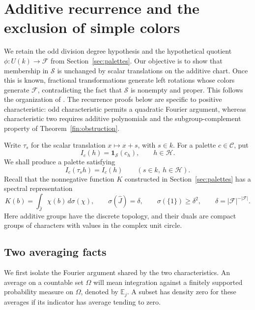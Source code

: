\section{Additive recurrence and the exclusion of simple colors}
\label{sec:recurrence}

We retain the odd division degree hypothesis and the hypothetical quotient
\(\phi:U(k)\to\mathcal F\) from Section~\ref{sec:palettes}.  Our objective is
to show that membership in \(\mathcal S\) is unchanged by scalar translations
on the additive chart.  Once this is known, fractional transformations
generate left rotations whose colors generate \(\mathcal F\), contradicting
the fact that \(\mathcal S\) is nonempty and proper.  This follows the
organization of \cite[Sections~5.5--5.6]{MPNF}.  The recurrence proofs below
are specific to positive characteristic: odd characteristic permits a
quadratic Fourier argument, whereas characteristic two requires additive
polynomials and the subgroup-complement property of
Theorem~\ref{fin:obstruction}.

Write \(\tau_s\) for the scalar translation \(x\mapsto x+s\), with
\(s\in k\).  For a palette \(c\in\mathcal C\), put
\[
 I_c(h)=\boldsymbol 1_{\mathcal S}(c_h),\qquad h\in\mathcal H.
\]
We shall produce a palette satisfying
\begin{equation}\label{rec:translation-invariance}
 I_c(\tau_s h)=I_c(h)\qquad(s\in k,\ h\in\mathcal H).
\end{equation}
Recall that the nonnegative function \(K\) constructed in
Section~\ref{sec:palettes} has a spectral representation
\[
 K(b)=\int_{\widehat J}\chi(b)\,d\sigma(\chi),\qquad
 \sigma(\widehat J)=\delta,\qquad \sigma(\{1\})\geq\delta^2,
 \qquad \delta=|\mathcal F|^{-|\mathcal F|}.
\]
Here additive groups have the discrete topology, and their duals are
compact groups of characters with values in the complex unit circle.

\subsection{Two averaging facts}

We first isolate the Fourier argument shared by the two characteristics.
An average on a countable set \(\Omega\) will mean integration against a
finitely supported probability measure on \(\Omega\), denoted by
\(\mathbb E_j\).  A subset has density zero for these averages if its
indicator has average tending to zero.

